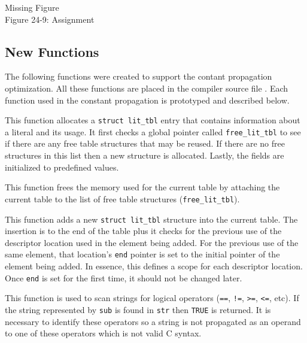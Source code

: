 \bigskip

{\centering{}
  {\color{red}Missing Figure}\\
Figure 24-9: Assignment
\par}

\subsection{New Functions}

The following functions were created to support the contant
propagation optimization. All these functions are placed in the
compiler source file . Each function used in the
constant propagation is prototyped and described below.


This function allocates a \texttt{struct lit\_tbl} entry that contains
information about a literal and its usage. It first checks a global
pointer called \texttt{free\_lit\_tbl} to see if there are any free
table structures that may be reused. If there are no free structures
in this list then a new structure is allocated. Lastly, the fields are
initialized to predefined values.


This function frees the memory used for the current table by attaching
the current table to the list of free table structures
(\texttt{free\_lit\_tbl}).


This function adds a new \texttt{struct lit\_tbl} structure into the current
table. The insertion is to the end of the table plus it checks for the
previous use of the descriptor location used in the element being
added. For the previous use of the same element, that location's
\texttt{end} pointer is set to the initial pointer of the element
being added. In essence, this defines a scope for each descriptor
location. Once \texttt{end} is set for the first time, it should not
be changed later.


This function is used to scan strings for logical operators
(\texttt{==}, \texttt{!=}, \texttt{{\textgreater}=},
\texttt{{\textless}=}, etc). If the string represented by \texttt{sub}
is found in \texttt{str} then \texttt{TRUE} is returned. It is
necessary to identify these operators so a string is not propagated as
an operand to one of these operators which is not valid C syntax.

